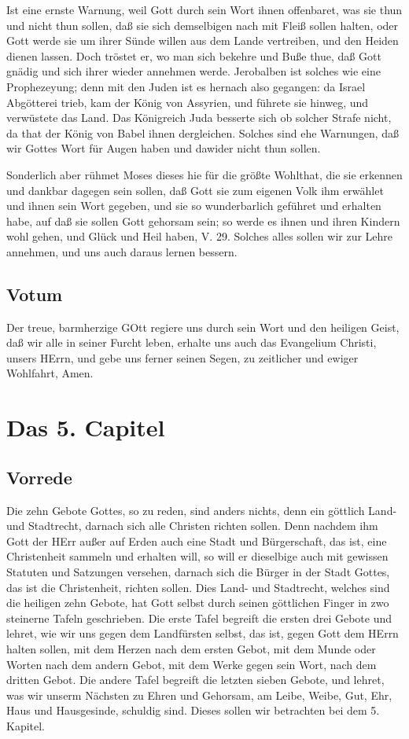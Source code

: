 Ist eine ernste Warnung, weil Gott durch sein Wort ihnen offenbaret, was sie thun und nicht thun sollen, daß sie sich demselbigen nach mit Fleiß sollen halten, oder Gott werde sie um ihrer Sünde willen aus dem Lande vertreiben, und den Heiden dienen lassen. Doch tröstet er, wo man sich bekehre und Buße thue, daß Gott gnädig und sich ihrer wieder annehmen werde. Jerobalben ist solches wie eine Prophezeyung; denn mit den Juden ist es hernach also gegangen: da Israel Abgötterei trieb, kam der König von Assyrien, und führete sie hinweg, und verwüstete das Land. Das Königreich Juda besserte sich ob solcher Strafe nicht, da that der König von Babel ihnen dergleichen. Solches sind ehe Warnungen, daß wir Gottes Wort für Augen haben und dawider nicht thun sollen.

Sonderlich aber rühmet Moses dieses hie für die größte Wohlthat, die sie erkennen und dankbar dagegen sein sollen, daß Gott sie zum eigenen Volk ihm erwählet und ihnen sein Wort gegeben, und sie so wunderbarlich geführet und erhalten habe, auf daß sie sollen Gott gehorsam sein; so werde es ihnen und ihren Kindern wohl gehen, und Glück und Heil haben, V. 29. Solches alles sollen wir zur Lehre annehmen, und uns auch daraus lernen bessern.

\section{Votum}

Der treue, barmherzige GOtt regiere uns durch sein Wort und den heiligen Geist, daß wir alle in seiner Furcht leben, erhalte uns auch das Evangelium Christi, unsers HErrn, und gebe uns ferner seinen Segen, zu zeitlicher und ewiger Wohlfahrt, Amen.

\chapter{Das 5. Capitel}

\section{Vorrede}

Die zehn Gebote Gottes, so zu reden, sind anders nichts, denn ein göttlich Land- und Stadtrecht, darnach sich alle Christen richten sollen. Denn nachdem ihm Gott der HErr außer auf Erden auch eine Stadt und Bürgerschaft, das ist, eine Christenheit sammeln und erhalten will, so will er dieselbige auch mit gewissen Statuten und Satzungen versehen, darnach sich die Bürger in der Stadt Gottes, das ist die Christenheit, richten sollen. Dies Land- und Stadtrecht, welches sind die heiligen zehn Gebote, hat Gott selbst durch seinen göttlichen Finger in zwo steinerne Tafeln geschrieben. Die erste Tafel begreift die ersten drei Gebote und lehret, wie wir uns gegen dem Landfürsten selbst, das ist, gegen Gott dem HErrn halten sollen, mit dem Herzen nach dem ersten Gebot, mit dem Munde oder Worten nach dem andern Gebot, mit dem Werke gegen sein Wort, nach dem dritten Gebot. Die andere Tafel begreift die letzten sieben Gebote, und lehret, was wir unserm Nächsten zu Ehren und Gehorsam, am Leibe, Weibe, Gut, Ehr, Haus und Hausgesinde, schuldig sind. Dieses sollen wir betrachten bei dem 5. Kapitel.

